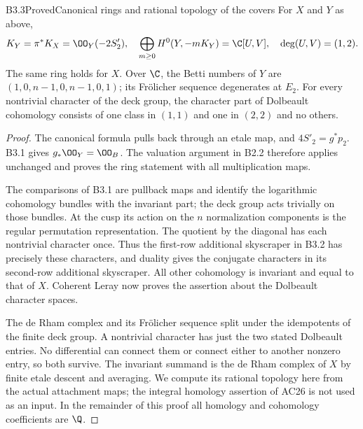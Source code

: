 \begin{claim}{B3.3}{Proved}{Canonical rings and rational topology of the covers}
For $X$ and $Y$ as above,
\[
K_Y=\pi^*K_X=\OO_Y(-2S'_2),\quad
\bigoplus_{m\ge0}H^0(Y,-mK_Y)=\C[U,V],\quad
\deg(U,V)=(1,2).
\]
The same ring holds for $X$.
Over $\C$, the Betti numbers of $Y$ are
$(1,0,n-1,0,n-1,0,1)$; its Fr\"olicher sequence degenerates at $E_2$.
For every nontrivial character of the deck group, the character
part of Dolbeault cohomology consists of one class in $(1,1)$ and
one in $(2,2)$ and no others.
\end{claim}
\begin{proof}
The canonical formula pulls back through an etale map, and
$4S'_2=g^*p_2$. B3.1 gives $g_*\OO_Y=\OO_B$.
The valuation argument in B2.2 therefore applies unchanged and proves
the ring statement with all multiplication maps.

The comparisons of B3.1 are pullback maps and identify the logarithmic
cohomology bundles with the invariant part; the deck group acts
trivially on those bundles. At the cusp its action on the $n$
normalization components is the regular permutation representation.
The quotient by the diagonal has each nontrivial character once.
Thus the first-row additional skyscraper in B3.2 has precisely these
characters, and duality gives the conjugate characters in its
second-row additional skyscraper. All other cohomology is invariant
and equal to that of $X$. Coherent Leray now proves the assertion
about the Dolbeault character spaces.

The de Rham complex and its Fr\"olicher sequence split under the
idempotents of the finite deck group. A nontrivial character has just
the two stated Dolbeault entries. No differential can connect them
or connect either to another nonzero entry, so both survive.
The invariant summand is the de Rham complex of $X$ by finite
etale descent and averaging. We compute its rational topology here
from the actual attachment maps; the integral homology assertion
of AC26 is not used as an input. In the remainder of this proof
all homology and cohomology coefficients are $\Q$.


\end{proof}
